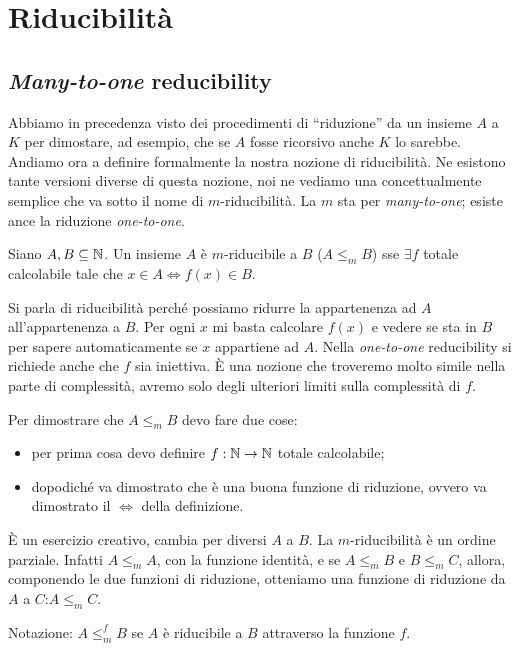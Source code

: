 \chapter{Riducibilità}

\section{\emph{Many-to-one} reducibility}

Abbiamo in precedenza visto dei procedimenti di ``riduzione'' da un insieme $A$ a $K$ per dimostare,
ad esempio, che se $A$ fosse ricorsivo anche $K$ lo sarebbe. Andiamo ora a definire formalmente la
nostra nozione di riducibilità. Ne esistono tante versioni diverse di questa nozione, noi ne
vediamo una concettualmente semplice che va sotto il nome di $m$-riducibilità. La $m$ sta per
\emph{many-to-one}; esiste ance la riduzione \emph{one-to-one}.

\begin{defn}
    Siano $A,B \subseteq \mathbb{N}$. Un insieme $A$ è $m$-riducibile a $B$ ($A \leq_{m} B$) sse
    $\exists f$ totale calcolabile tale che $x \in A \iff f(x) \in B$.
\end{defn}

Si parla di riducibilità perché possiamo ridurre la appartenenza ad $A$ all'appartenenza a $B$.
Per ogni $x$ mi basta calcolare $f(x)$ e vedere se sta in $B$ per sapere automaticamente se $x$
appartiene ad $A$. Nella \emph{one-to-one} reducibility si richiede anche che $f$ sia iniettiva. È una
nozione che troveremo molto simile nella parte di complessità, avremo solo degli ulteriori limiti
sulla complessità di $f$. 

Per dimostrare che $A \leq_{m} B$ devo fare due cose:
\begin{itemize}
    \item per prima cosa devo definire $f: \mathbb{N} \to \mathbb{N}$ totale calcolabile;
    \item dopodiché va dimostrato che è una buona funzione di riduzione, ovvero va dimostrato il
    $\iff$ della definizione.
\end{itemize}

È un esercizio creativo, cambia per diversi $A$ a $B$. La $m$-riducibilità è un ordine parziale.
Infatti $A \leq_{m} A$, con la funzione identità, e se $A \leq_{m} B$ e $B \leq_{m} C$, allora, componendo le due
funzioni di riduzione, otteniamo una funzione di riduzione da $A$ a $C$:$A \leq_{m} C$. 

Notazione: $A \leq_{m}^{f} B$ se $A$ è riducibile a $B$ attraverso la funzione $f$.

